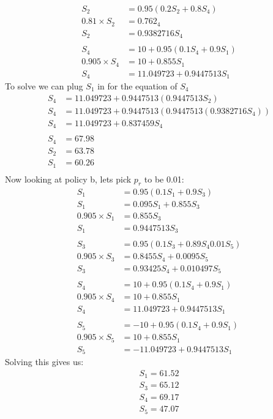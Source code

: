 \documentclass{article}
\begin{document}
\begin{titlepage}
\begin{align*}
S_2 &= 0.95(0.2S_2 + 0.8S_4) \\
0.81\times S_2 &= 0.762_4 \\
S_2 &= 0.9382716S_4 \\\\
S_4 &= 10 + 0.95(0.1S_4 + 0.9S_1) \\
0.905\times S_4  &= 10 +0.855S_1  \\
S_4 &= 11.049723 + 0.9447513S_1
\end{align*}
To solve we can plug $S_1$ in for the equation of $S_4$
\begin{align*}
S_4 &= 11.049723 + 0.9447513( 0.9447513S_2) \\
S_4 &= 11.049723 + 0.9447513( 0.9447513(0.9382716S_4)) \\
S_4 &= 11.049723 + 0.837459S_4 \\\\
S_4 &= 67.98 \\
S_2 &= 63.78 \\
S_1 &= 60.26 \\
\end{align*}
\newpage
Now looking at policy b, lets pick $p_r$ to be 0.01:
\begin{align*}
S_1 &= 0.95(0.1S_1 +0.9S_3) \\
S_1 &= 0.095S_1 + 0.855S_3 \\
0.905\times S_1 &= 0.855S_3 \\
S_1 &= 0.9447513S_3 \\\\
S_3 &= 0.95(0.1S_3 + 0.89S_4 0.01S_5) \\
0.905\times S_3 &= 0.8455S_4 + 0.0095S_5 \\
S_3 &= 0.93425S_4 + 0.010497S_5 \\\\
S_4 &= 10 + 0.95(0.1S_4 + 0.9S_1) \\
0.905\times S_4  &= 10 +0.855S_1  \\
S_4 &= 11.049723 + 0.9447513S_1 \\\\
S_5 &= -10 + 0.95(0.1S_4 + 0.9S_1) \\
0.905\times S_5  &= 10 +0.855S_1  \\
S_5 &= -11.049723 + 0.9447513S_1
\end{align*}
Solving this gives us:
\begin{align*}
S_1 = 61.52\\
S_3 = 65.12\\
S_4 = 69.17\\
S_5 = 47.07
\end{align*}

\end{titlepage}
\end{document}
